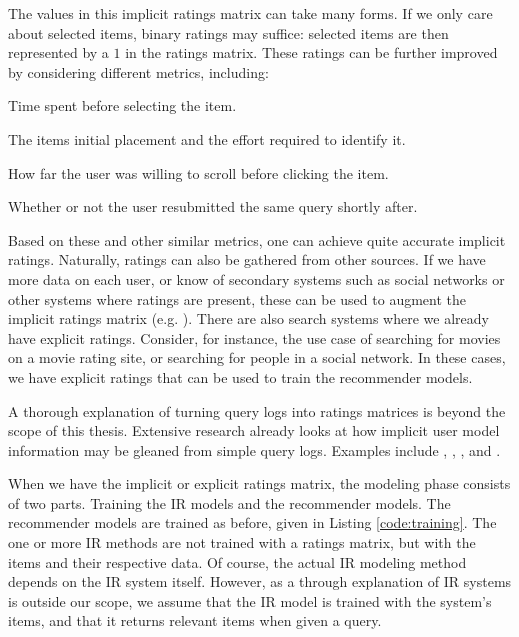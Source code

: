The values in this implicit ratings matrix can take many forms.
If we only care about selected items, binary ratings may suffice:
selected items are then represented by a $1$ in the ratings matrix.
These ratings can be further improved by considering different metrics, including:

\begin{itemize*}
  \item Time spent before selecting the item.
  \item The items initial placement and the effort required to identify it.
  \item How far the user was willing to scroll before clicking the item.
  \item Whether or not the user resubmitted the same query shortly after.
\end{itemize*}

Based on these and other similar metrics, one can achieve quite accurate implicit ratings.
Naturally, ratings can also be gathered from other sources.
If we have more data on each user, or know of secondary systems such as social networks
or other systems where ratings are present, these can be used to augment the implicit ratings matrix
(e.g. \cite{Carmel2009}).
There are also search systems where we already have explicit ratings.
Consider, for instance, the use case of searching for movies on a movie rating site,
or searching for people in a social network.
In these cases, we have explicit ratings that can be used to train the recommender models.

A thorough explanation of turning query logs into ratings matrices
is beyond the scope of this thesis. Extensive research already
looks at how implicit user model information may be gleaned
from simple query logs. Examples include \cite{Joachims2007},
\cite{Lee2005}, \cite{Agichtein2006}, \cite{Mobasher} and
\cite{Speretta2000}.

When we have the implicit or explicit ratings matrix, the modeling phase
consists of two parts. Training the IR models and the recommender models.
The recommender models are trained as before, given in Listing \ref{code:training}.
The one or more IR methods are not trained with a ratings matrix,
but with the items and their respective data.
Of course, the actual IR modeling method depends on the IR system itself.
However, as a through explanation of IR systems is outside our scope,
we assume that the IR model is trained with the system's items,
and that it returns relevant items when given a query.


